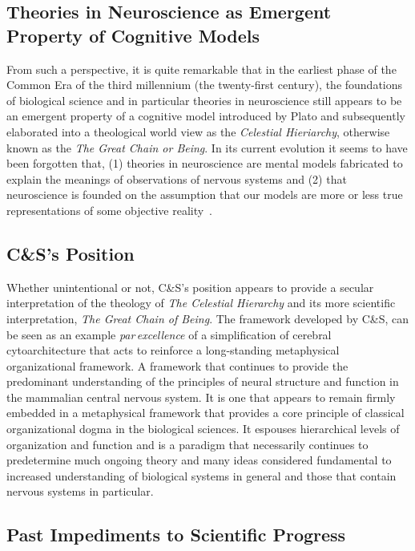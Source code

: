 \documentclass[10pt,letterpaper]{article}
\begin{document}
\subsection*{Theories in Neuroscience as Emergent Property of Cognitive Models}
From such a perspective, it is quite remarkable that in the earliest phase of the Common Era of the third millennium (the twenty-first century), the foundations of biological science and in particular theories in neuroscience still appears to be an emergent property of a cognitive model introduced by Plato and subsequently elaborated into a theological world view as the {\it{Celestial Hieriarchy}}, otherwise known as the {\it{The Great Chain or Being}}. In its current evolution it seems to have been forgotten that, (1) theories in neuroscience are mental models fabricated to explain the meanings of observations of nervous systems and (2) that neuroscience is founded on the assumption that our models are more or less true representations of some objective reality~\cite{jacobson93}.

\subsection*{C\&S's Position}

Whether unintentional or not, C\&S's position appears to provide a secular interpretation of the theology of {\it{The Celestial Hierarchy}} and its more scientific interpretation, {\it{The Great Chain of Being}}. The framework developed by C\&S, can be seen as an example {\it{par\,excellence}} of a simplification of cerebral cytoarchitecture that acts to reinforce a long-standing metaphysical organizational framework. A framework that continues to provide the predominant understanding of the principles of neural structure and function in the mammalian central nervous system. It is one that appears to remain firmly embedded in a metaphysical framework that provides a core principle of classical organizational dogma in the biological sciences. It espouses hierarchical levels of organization and function and is a paradigm that necessarily continues to predetermine much ongoing theory and many ideas considered fundamental to increased understanding of biological systems in general and those that contain nervous systems in particular.


\subsection*{Past Impediments to Scientific Progress}
\end{document}
